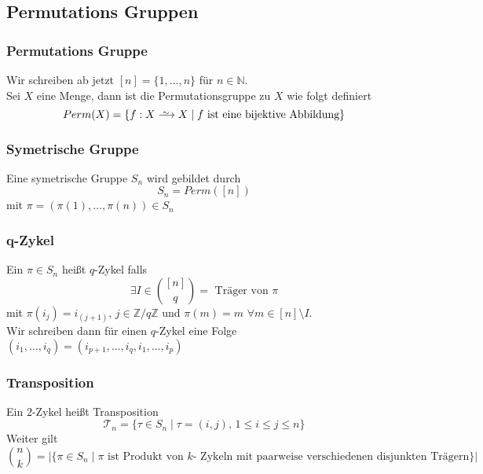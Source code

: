 \documentclass[12pt, german]{article}
\newcommand\iso{\xrightarrow{
		\,\smash{\raisebox{-0.65ex}{\ensuremath{\scriptstyle\sim}}}\,}}
\begin{document}
	\subsection{Permutations Gruppen}
	\subsubsection{Permutations Gruppe}
	Wir schreiben ab jetzt $[n] = \{1, \ldots, n\}$ für $n \in \mathbb N$.  \\ 
	\newline
	Sei $X$ eine Menge, dann ist die Permutationsgruppe zu $X$ wie folgt definiert 
	$$Perm(X)= \{ f: X \iso X \mid f \text{ ist eine bijektive Abbildung}\}$$
	
	\subsubsection{Symetrische Gruppe}
	Eine symetrische Gruppe $S_n$ wird gebildet durch $$S_n = Perm([n])$$ mit $\pi = (\pi(1), \ldots, \pi(n)) \in S_n$
	
	\subsubsection{q-Zykel}
	Ein $\pi \in S_n$ heißt $q$-Zykel falls $$ \exists I \in \binom{[n]}{q} = \text{ Träger von $\pi$}$$ mit $\pi(i_j) = i_{(j+1)}, \, j \in \mathbb Z / q \mathbb Z$ und $\pi(m)= m$ $\forall m \in [n]  \setminus  I$. \\ 
	Wir schreiben dann für einen $q$-Zykel eine Folge $(i_1, \ldots, i_q) = (i_{p+1}, \ldots, i_q, i_1, \ldots, i_p)$
	
	\subsubsection{Transposition}
	Ein $2$-Zykel heißt Transposition $$\mathcal T_n = \{ \tau \in S_n  \mid \tau = (i, j), \, 1 \leq i \leq j \leq n\}$$
	Weiter gilt $$\binom{n}{k} = |\{ \pi \in S_n \mid \pi \text{ ist Produkt von $k$- Zykeln  mit paarweise verschiedenen disjunkten Trägern} \}|$$
\end{document}
